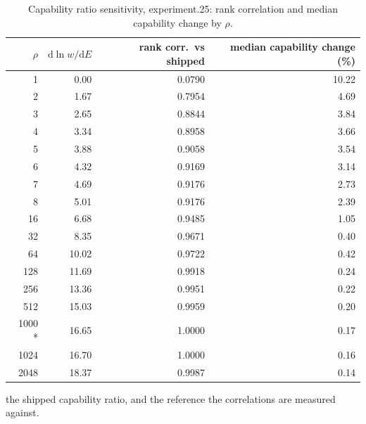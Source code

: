 \begin{table}[htbp]
  \centering
  \caption{Capability ratio sensitivity, experiment.25: rank correlation and median capability change by $\rho$.}
  \label{tab:rho-experiment-25-summary}
  \begin{tabular}{r r r r}
    \toprule
    $\rho$ & $\mathrm{d}\ln w/\mathrm{d}E$ & rank corr.\ vs shipped & median capability change (\%) \\
    \midrule
    1 & 0.00 & 0.0790 & 10.22 \\
    2 & 1.67 & 0.7954 & 4.69 \\
    3 & 2.65 & 0.8844 & 3.84 \\
    4 & 3.34 & 0.8958 & 3.66 \\
    5 & 3.88 & 0.9058 & 3.54 \\
    6 & 4.32 & 0.9169 & 3.14 \\
    7 & 4.69 & 0.9176 & 2.73 \\
    8 & 5.01 & 0.9176 & 2.39 \\
    16 & 6.68 & 0.9485 & 1.05 \\
    32 & 8.35 & 0.9671 & 0.40 \\
    64 & 10.02 & 0.9722 & 0.42 \\
    128 & 11.69 & 0.9918 & 0.24 \\
    256 & 13.36 & 0.9951 & 0.22 \\
    512 & 15.03 & 0.9959 & 0.20 \\
    1000 * & 16.65 & 1.0000 & 0.17 \\
    1024 & 16.70 & 1.0000 & 0.16 \\
    2048 & 18.37 & 0.9987 & 0.14 \\
    \bottomrule
  \end{tabular}
  \par\smallskip\footnotesize * the shipped capability ratio, and the reference the correlations are measured against.
\end{table}
